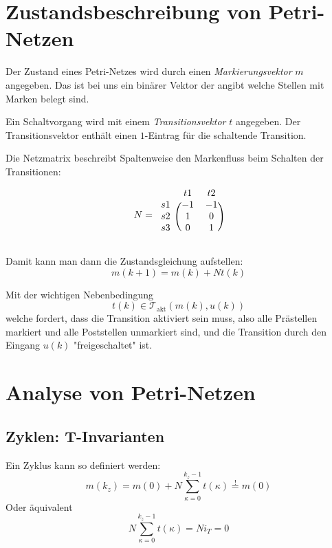 \section{Zustandsbeschreibung von Petri-Netzen}

Der Zustand eines Petri-Netzes wird durch einen \emph{Markierungsvektor} $m$ angegeben.
Das ist bei uns ein binärer Vektor der angibt welche Stellen mit Marken belegt sind.

Ein Schaltvorgang wird mit einem \emph{Transitionsvektor} $t$ angegeben.
Der Transitionsvektor enthält einen $1$-Eintrag für die schaltende Transition.

Die Netzmatrix beschreibt Spaltenweise den Markenfluss beim Schalten der Transitionen:

\begin{equation}
    N =
    \begin{blockarray}{ccc}
        & t1 & t2 \\
        \begin{block}{c(cc)}
            s1 & -1 & -1 \\
            s2 &  1 &  0 \\
            s3 &  0 &  1 \\
        \end{block}
    \end{blockarray}
\end{equation}

Damit kann man dann die Zustandsgleichung aufstellen:
\begin{equation}
    m(k+1) = m(k) + N t(k)
\end{equation}

Mit der wichtigen Nebenbedingung
\begin{equation}
    t(k) \in \mathcal{T}_\text{akt}(m(k), u(k))
\end{equation}
welche fordert, dass die Transition aktiviert sein muss, also alle
Prästellen markiert und alle Poststellen unmarkiert sind, und die Transition
durch den Eingang $u(k)$ "freigeschaltet" ist.

\section{Analyse von Petri-Netzen}
\subsection{Zyklen: T-Invarianten}
Ein Zyklus kann so definiert werden:
\begin{equation}
    m(k_z) = m(0) + N \sum_{\kappa=0}^{k_z-1} t(\kappa) \overset{!}{=} m(0)
\end{equation}
Oder äquivalent
\begin{equation}
    N \sum_{\kappa=0}^{k_z-1} t(\kappa) = N i_T = 0
\end{equation}

